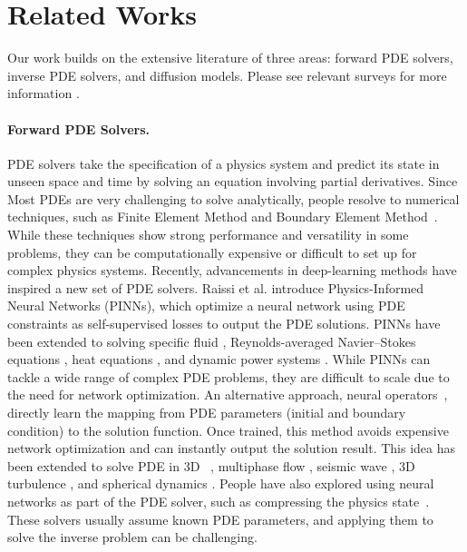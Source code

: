 \section{Related Works}
Our work builds on the extensive literature of three areas: forward PDE solvers, inverse PDE solvers, and diffusion models.
Please see relevant surveys for more information \cite{evans2022partial, omori2007overview, po2023state,strauss2007partial, yang2023diffusion}.

\vspace{-1.5em}\noindent
\paragraph{Forward PDE Solvers.} 
PDE solvers take the specification of a physics system and predict its state in unseen space and time by solving an equation involving partial derivatives.
Since Most PDEs are very challenging to solve analytically, people resolve to numerical techniques, such as Finite Element Method \cite{quarteroni2008numerical,solin2005partial} and Boundary Element Method~\cite{aliabadi2020boundary,idelsohn2003meshless}.
While these techniques show strong performance and versatility in some problems, they can be computationally expensive or difficult to set up for complex physics systems.
Recently, advancements in deep-learning methods have inspired a new set of PDE solvers.
Raissi et al. \cite{raissi2017physics, raissi2019physics} introduce Physics-Informed Neural Networks (PINNs), which optimize a neural network using PDE constraints as self-supervised losses to output the PDE solutions. 
PINNs have been extended to solving specific fluid \cite{cai2021physicsfluid, mao2020physics}, Reynolds-averaged Navier–Stokes equations \cite{eivazi2022physics}, heat equations \cite{cai2021physicsheat}, and dynamic power systems \cite{misyris2020physics}.
While PINNs can tackle a wide range of complex PDE problems, they are difficult to scale due to the need for network optimization.
An alternative approach, neural operators~\cite{li2020fourier,lu2021learning}, directly learn the mapping from PDE parameters (\eg initial and boundary condition) to the solution function.
Once trained, this method avoids expensive network optimization and can instantly output the solution result.
This idea has been extended to solve PDE in 3D~\cite{li2024geometry,serrano2024operator} , multiphase flow \cite{wen2022u}, seismic wave \cite{lehmann2023fourier,li2023solving}, 3D turbulence \cite{li2022fourier, peng2023linear}, and spherical dynamics \cite{bonev2023spherical}. 
People have also explored using neural networks as part of the PDE solver, such as compressing the physics state~\cite{chen2022crom,li2023neural,muller2021real,nam2024solving}.
These solvers usually assume known PDE parameters, and applying them to solve the inverse problem can be challenging.

